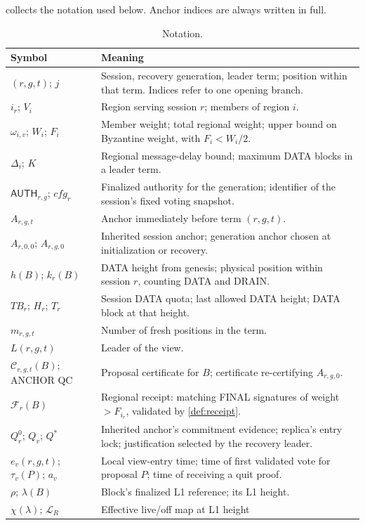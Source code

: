 \documentclass[11pt,a4paper]{article}
\newcommand{\QC}{\mathcal C}
\newcommand{\FC}{\mathcal F}
\newcommand{\TB}{\mathit{TB}}
\newcommand{\tagg}[1]{\ensuremath{\mathsf{#1}}}
\begin{document}
 collects the notation used below. Anchor indices
are always written in full.
\begin{table}[htbp]\centering\small
\caption{Notation.}\label{tab:notation}
\begin{tabularx}{\linewidth}{@{}p{.29\linewidth}Y@{}}
\toprule Symbol & Meaning\\\midrule
$(r,g,t)$; $j$ & Session, recovery generation, leader term; position
within that term. Indices refer to one opening branch.\\
$i_r$; $V_i$ & Region serving session $r$; members of region $i$.\\
$\omega_{i,v}$; $W_i$; $F_i$ & Member weight; total regional weight;
upper bound on Byzantine weight, with $F_i<W_i/2$.\\
$\Delta_i$; $K$ & Regional message-delay bound; maximum DATA blocks
in a leader term.\\
$\tagg{AUTH}_{r,g}$; $\mathit{cfg}_r$ & Finalized authority for the
generation; identifier of the session's fixed voting snapshot.\\
$A_{r,g,t}$ & Anchor immediately before term $(r,g,t)$.\\
$A_{r,0,0}$; $A_{r,g,0}$ & Inherited session anchor; generation anchor
chosen at initialization or recovery.\\
$h(B)$; $k_r(B)$ & DATA height from genesis; physical position within
session $r$, counting DATA and DRAIN.\\
$\TB_r$; $H_r$; $T_r$ & Session DATA quota; last allowed DATA height;
DATA block at that height.\\
$m_{r,g,t}$ & Number of fresh positions in the term.\\
$L(r,g,t)$ & Leader of the view.\\
$\QC_{r,g,t}(B)$; ANCHOR QC & Proposal certificate for $B$;
certificate re-certifying $A_{r,g,0}$.\\
$\FC_r(B)$ & Regional receipt: matching FINAL signatures of weight
$>F_{i_r}$, validated by \cref{def:receipt}.\\
$Q_r^0$; $Q_v$; $Q^*$ & Inherited anchor's commitment evidence; replica's entry
lock; justification selected by the recovery leader.\\
$e_v(r,g,t)$; $\tau_v(P)$; $a_v$ & Local view-entry time; time of first
validated vote for proposal $P$; time of receiving a quit proof.\\
$\rho$; $\lambda(B)$ & Block's finalized L1 reference; its L1 height.\\
$\chi(\lambda)$; $\mathcal L_R$ & Effective live/off map at L1 height

\end{tabularx}
\end{table}
\end{document}
